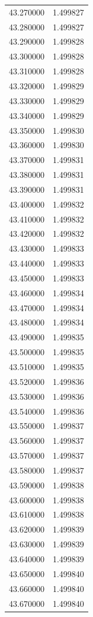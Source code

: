 \begin{tabular}{rr}
43.270000 & 1.499827 \\
43.280000 & 1.499827 \\
43.290000 & 1.499828 \\
43.300000 & 1.499828 \\
43.310000 & 1.499828 \\
43.320000 & 1.499829 \\
43.330000 & 1.499829 \\
43.340000 & 1.499829 \\
43.350000 & 1.499830 \\
43.360000 & 1.499830 \\
43.370000 & 1.499831 \\
43.380000 & 1.499831 \\
43.390000 & 1.499831 \\
43.400000 & 1.499832 \\
43.410000 & 1.499832 \\
43.420000 & 1.499832 \\
43.430000 & 1.499833 \\
43.440000 & 1.499833 \\
43.450000 & 1.499833 \\
43.460000 & 1.499834 \\
43.470000 & 1.499834 \\
43.480000 & 1.499834 \\
43.490000 & 1.499835 \\
43.500000 & 1.499835 \\
43.510000 & 1.499835 \\
43.520000 & 1.499836 \\
43.530000 & 1.499836 \\
43.540000 & 1.499836 \\
43.550000 & 1.499837 \\
43.560000 & 1.499837 \\
43.570000 & 1.499837 \\
43.580000 & 1.499837 \\
43.590000 & 1.499838 \\
43.600000 & 1.499838 \\
43.610000 & 1.499838 \\
43.620000 & 1.499839 \\
43.630000 & 1.499839 \\
43.640000 & 1.499839 \\
43.650000 & 1.499840 \\
43.660000 & 1.499840 \\
43.670000 & 1.499840 \\

\end{tabular}
